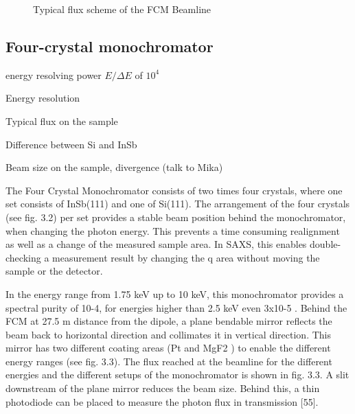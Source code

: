 \begin{figure}%
	\centering
		\caption{Typical flux scheme of the FCM Beamline}
		\label{fig:FCMBeamlineFlux}
\end{figure}

\subsection{Four-crystal monochromator}
\label{sec:fcm}

energy resolving power \( E/\Delta E \) of \( 10^4 \)

Energy resolution

Typical flux on the sample

Difference between Si and InSb

Beam size on the sample, divergence (talk to Mika)

The Four Crystal Monochromator consists of two times four crystals, where one set consists of InSb(111) and one of Si(111). The arrangement of the four crystals (see fig. 3.2) per set provides a stable beam position behind the monochromator, when changing the photon energy. This prevents a time consuming realignment as well as a change of the measured sample area. In SAXS, this enables double-checking a measurement result by changing the q area without moving the sample or the detector.

In the energy range from 1.75 keV up to 10 keV, this monochromator provides a spectral purity of 10-4, for energies higher than 2.5 keV even 3x10-5 . Behind the FCM at 27.5 m distance from the dipole, a plane bendable mirror reflects the beam back to horizontal direction and collimates it in vertical direction. This mirror has two different coating areas (Pt and MgF2 ) to enable the different energy ranges (see fig. 3.3). The flux reached at the beamline for the different energies and the different setups of the monochromator is shown in fig. 3.3. A slit downstream of the plane mirror reduces the beam size. Behind this, a thin photodiode can be placed to measure the photon flux in transmission [55].


